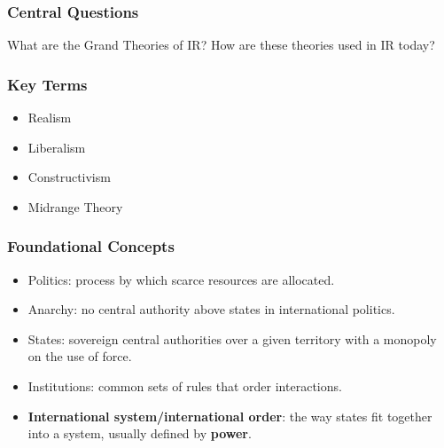 \documentclass[handout]{beamer}
\begin{document}
\begin{frame} 
	\frametitle{\LARGE{Central Questions}}
	\begin{center}
		\LARGE What are the Grand Theories of IR? 
		\LARGE How are these theories used in IR today? 
	\end{center}
\end{frame}

\begin{frame} 
	\frametitle{\LARGE{Key Terms}}
	\begin{itemize}
		\item Realism
		\item Liberalism
		\item Constructivism
		\item Midrange Theory 
	\end{itemize}
\end{frame}

\begin{frame} 
\frametitle{\LARGE{Foundational Concepts}}
    \begin{itemize}
        \item Politics: process by which scarce resources are allocated.
        \item Anarchy: no central authority above states in international politics.
        \item States: sovereign central authorities over a given territory with a monopoly on the use of force.
        \item Institutions: common sets of rules that order interactions.
        \item \textbf{International system/international order}: the way states fit together into a system, usually defined by \textbf{power}.
    \end{itemize}
\end{frame}
\end{document}
